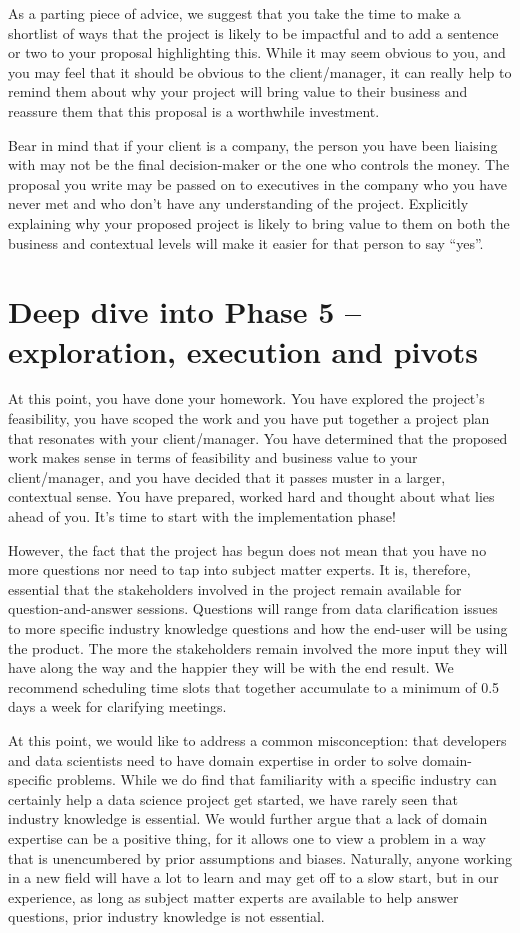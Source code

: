 \documentclass[
]{book}
\begin{document}
As a parting piece of advice, we suggest that you take the time to make
a shortlist of ways that the project is likely to be impactful and to
add a sentence or two to your proposal highlighting this. While it may
seem obvious to you, and you may feel that it should be obvious to the
client/manager, it can really help to remind them about why your project
will bring value to their business and reassure them that this proposal
is a worthwhile investment.

Bear in mind that if your client is a company, the person you have been
liaising with may not be the final decision-maker or the one who
controls the money. The proposal you write may be passed on to
executives in the company who you have never met and who don't have any
understanding of the project. Explicitly explaining why your proposed
project is likely to bring value to them on both the business and
contextual levels will make it easier for that person to say ``yes''.

\hypertarget{execution}{%
\chapter{Deep dive into Phase 5 -- exploration, execution and
pivots}\label{execution}}

At this point, you have done your homework. You have explored the
project's feasibility, you have scoped the work and you have put
together a project plan that resonates with your client/manager. You
have determined that the proposed work makes sense in terms of
feasibility and business value to your client/manager, and you have
decided that it passes muster in a larger, contextual sense. You have
prepared, worked hard and thought about what lies ahead of you. It's
time to start with the implementation phase!

However, the fact that the project has begun does not mean that you have
no more questions nor need to tap into subject matter experts. It is,
therefore, essential that the stakeholders involved in the project
remain available for question-and-answer sessions. Questions will range
from data clarification issues to more specific industry knowledge
questions and how the end-user will be using the product. The more the
stakeholders remain involved the more input they will have along the way
and the happier they will be with the end result. We recommend
scheduling time slots that together accumulate to a minimum of 0.5 days
a week for clarifying meetings.

At this point, we would like to address a common misconception: that
developers and data scientists need to have domain expertise in order to
solve domain-specific problems. While we do find that familiarity with a
specific industry can certainly help a data science project get started,
we have rarely seen that industry knowledge is essential. We would
further argue that a lack of domain expertise can be a positive thing,
for it allows one to view a problem in a way that is unencumbered by
prior assumptions and biases. Naturally, anyone working in a new field
will have a lot to learn and may get off to a slow start, but in our
experience, as long as subject matter experts are available to help
answer questions, prior industry knowledge is not essential.
\end{document}
